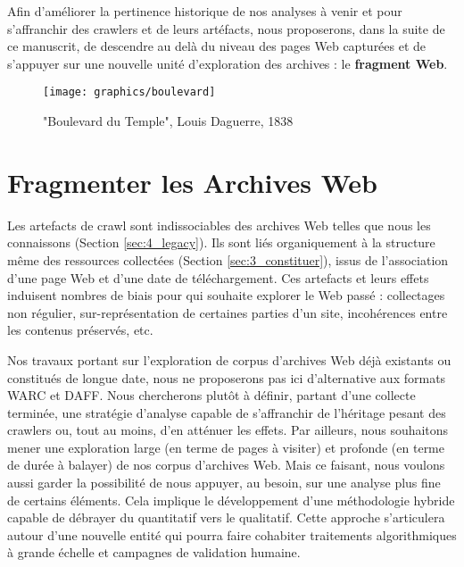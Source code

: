 \documentclass[symmetric,justified,marginals=raggedouter]{tufte-book}
\begin{document}
Afin d'améliorer la pertinence historique de nos analyses à venir et pour s'affranchir des crawlers et de leurs artéfacts, nous proposerons, dans la suite de ce manuscrit, de descendre au delà du niveau des pages Web capturées et de s'appuyer sur une nouvelle unité d'explo\-ration des archives : le \textbf{fragment Web}. 

\begin{figure*}
  \centering
  \texttt{[image: graphics/boulevard]}
  \caption{"Boulevard du Temple", Louis Daguerre, 1838}
  \label{fig:boulevard}
\end{figure*}


\chapter{Fragmenter les Archives Web}
\label{chap:5}

\par\noindent Les artefacts de crawl sont indissociables des archives Web telles que nous les connaissons (Section \ref{sec:4_legacy}). Ils sont liés organiquement à la structure même des ressources collectées (Section \ref{sec:3_constituer}), issus de l'as\-sociation d'une page Web et d'une date de téléchargement. Ces artefacts et leurs effets induisent nombres de biais pour qui souhaite explorer le Web passé : collectages non régulier, sur-représenta\-tion de certaines parties d'un site, incohérences entre les contenus préservés, etc. 

Nos travaux portant sur l'exploration de corpus d'archives Web déjà existants ou constitués de longue date, nous ne proposerons pas ici d'alternative aux formats WARC et DAFF. Nous chercherons plutôt à définir, partant d'une collecte terminée, une stratégie d'analyse capable de s'affranchir de l'héritage pesant des crawlers ou, tout au moins, d'en atténuer les effets. Par ailleurs, nous souhaitons mener une exploration large (en terme de pages à visiter) et profonde (en terme de durée à balayer) de nos corpus d'archives Web. Mais ce faisant, nous voulons aussi garder la possibilité de nous appuyer, au besoin, sur une analyse plus fine de certains éléments. Cela implique le développement d'une méthodologie hybride capable de débrayer du quantitatif vers le qualitatif. Cette approche s'articulera autour d'une nouvelle entité qui pourra faire cohabiter traitements algorithmiques à grande échelle et campagnes de validation humaine.
\end{document}
